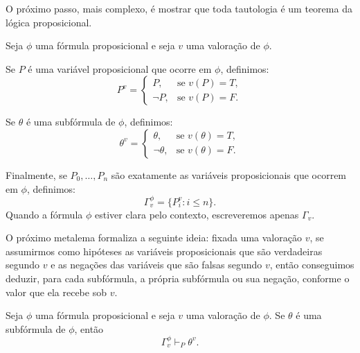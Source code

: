 O próximo passo, mais complexo, é mostrar que toda tautologia é um teorema da lógica proposicional.

\begin{convention}\label{conv:notacaoValoracaoAssinada}
    Seja $\phi$ uma fórmula proposicional e seja $v$ uma valoração de $\phi$.

    Se $P$ é uma variável proposicional que ocorre em $\phi$, definimos:
    \[
        P^v =
        \begin{cases}
            P, & \text{se } v(P)=T,\\
            \neg P, & \text{se } v(P)=F.
        \end{cases}
    \]

    Se $\theta$ é uma subfórmula de $\phi$, definimos:
    \[
        \theta^v =
        \begin{cases}
            \theta, & \text{se } v(\theta)=T,\\
            \neg\theta, & \text{se } v(\theta)=F.
        \end{cases}
    \]

    Finalmente, se $P_0,\dots,P_{n}$ são exatamente as variáveis proposicionais que ocorrem em $\phi$, definimos:
    \[
        \Gamma_v^\phi=\{P_i^v:i\leq n\}.
    \]
    Quando a fórmula $\phi$ estiver clara pelo contexto, escreveremos apenas $\Gamma_v$.
\end{convention}

O próximo metalema formaliza a seguinte ideia: fixada uma valoração $v$, se assumirmos como hipóteses as variáveis proposicionais que são verdadeiras segundo $v$ e as negações das variáveis que são falsas segundo $v$, então conseguimos deduzir, para cada subfórmula, a própria subfórmula ou sua negação, conforme o valor que ela recebe sob $v$.

\begin{metalemma}\label{mlem:fundamentalValoracoes}
    Seja $\phi$ uma fórmula proposicional e seja $v$ uma valoração de $\phi$.
    Se $\theta$ é uma subfórmula de $\phi$, então
    \[
        \Gamma_v^\phi \vdash_P \theta^v.
    \]
\end{metalemma}

